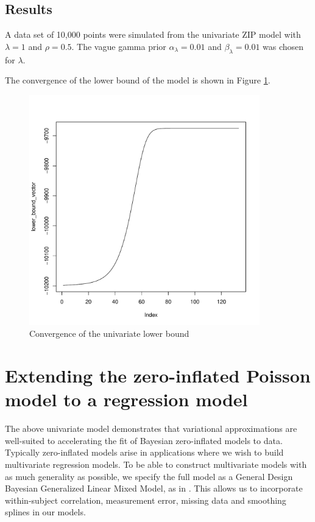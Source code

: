 \documentclass{article}[12pt]
\begin{document}
\subsection{Results}
A data set of 10,000 points were simulated from the univariate ZIP model with
$\lambda = 1$ and $\rho = 0.5$. The vague gamma prior $\alpha_\lambda = 0.01$ and $\beta_\lambda = 0.01$ was chosen for $\lambda$.

The convergence of the lower bound of the model is shown in Figure 
\ref{fig:univariate_lower_bound}.

\begin{figure}
\caption{Convergence of the univariate lower bound}
\label{fig:univariate_lower_bound}
\includegraphics[width=100mm,height=100mm]{code/lower_bound_convergence.pdf}
\end{figure}



\section{Extending the zero-inflated Poisson model to a regression model}
\noindent The above univariate model demonstrates that variational approximations are well-suited
to accelerating the fit of Bayesian zero-inflated models to data. Typically zero-inflated
models arise in applications where we wish to build multivariate regression models. To be able to
construct multivariate models with as much generality as possible, we specify the full
model as a General Design Bayesian Generalized Linear Mixed Model, as in \citep{zhao06}.
This allows us to incorporate within-subject correlation, measurement error, missing data
and smoothing splines in our models.
\end{document}
